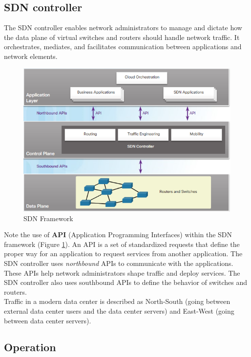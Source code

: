 \subsection{SDN controller}

The SDN controller enables network administrators to manage and dictate how the data plane of virtual switches and routers should handle network traffic. It orchestrates, mediates, and facilitates communication between applications and network elements.\\

\begin{figure}[hbtp]
\caption{SDN Framework}\label{SDNframework}
\centering
\includegraphics[scale=0.6]{pictures/SDNframework.PNG}
\end{figure}

Note the use of \textbf{API} (Application Programming Interfaces) within the SDN framework (Figure \ref{SDNframework}). An API is a set of standardized requests that define the proper way for an application to request services from another application. The SDN controller uses \emph{northbound} APIs to communicate with the applications. These APIs help network administrators shape traffic and deploy services. The SDN controller also uses southbound APIs to define the behavior of switches and routers. \\

\note Traffic in a modern data center is described as North-South (going between external data center users and the data center servers) and East-West (going between data center servers).\\

\subsection{Operation}

